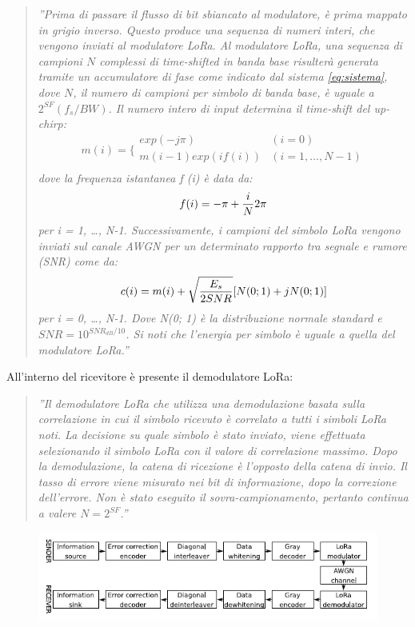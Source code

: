 \documentclass[a4paper]{report} %
\begin{document}
\begin{enumerate}
\begin{quote}	
	\textit{''Prima di passare il flusso di bit sbiancato al modulatore, è prima mappato in grigio inverso. Questo produce una sequenza di numeri interi, che vengono inviati al modulatore LoRa. Al modulatore LoRa, una sequenza di campioni $N$ complessi di time-shifted in banda base risulterà generata tramite un accumulatore di fase come indicato dal sistema \ref{eq:sistema}, dove $N$, il numero di campioni per simbolo di banda base, è uguale a $2^{SF}(f_s / BW)$. Il numero intero di input determina il time-shift del up-chirp: %
	\begin{equation}
	m(i) = \bigg \{
	\begin{array}{rl}
	exp(-j\pi) & (i = 0)\\
	m(i-1)exp(if(i)) & (i = 1, \dots, N-1)\\
	\end{array} 
	\label{eq:sistema}
	\end{equation}
	dove la frequenza istantanea f (i) è data da:
	\begin{equation}
	f(i) = -\pi + {i \over N} 2\pi  
	\end{equation}
	per i = 1, \dots, N-1. Successivamente, i campioni del simbolo LoRa vengono inviati sul canale AWGN per un determinato rapporto tra segnale e rumore (SNR) come da:
	\begin{equation}
	c(i) = m(i) + \sqrt{E_s \over 2SNR}[N(0; 1) + jN(0; 1)]
	\end{equation}
	per i = 0, \dots, N-1. Dove N(0; 1) è la distribuzione normale standard e $SNR = 10^{SNR_{dB} / 10}$. Si noti che l'energia per simbolo è uguale a quella del modulatore LoRa.''}
\end{quote}
All'interno del ricevitore è presente il demodulatore LoRa:
\begin{quote}
	\textit{''Il demodulatore LoRa che utilizza una demodulazione basata sulla correlazione in cui il simbolo ricevuto è correlato a tutti i simboli LoRa noti. La decisione su quale simbolo è stato inviato, viene effettuata selezionando il simbolo LoRa con il valore di correlazione massimo. Dopo la demodulazione, la catena di ricezione è l'opposto della catena di invio. Il tasso di errore viene misurato nei bit di informazione, dopo la correzione dell'errore. Non è stato eseguito il sovra-campionamento, pertanto continua a valere $N = 2^{SF}$.''}
\end{quote}

\begin{figure}
\centering
\includegraphics[scale=.7]{Immagini/SchemaABlocchi.png}


\end{figure}
\end{enumerate}
\end{document}
